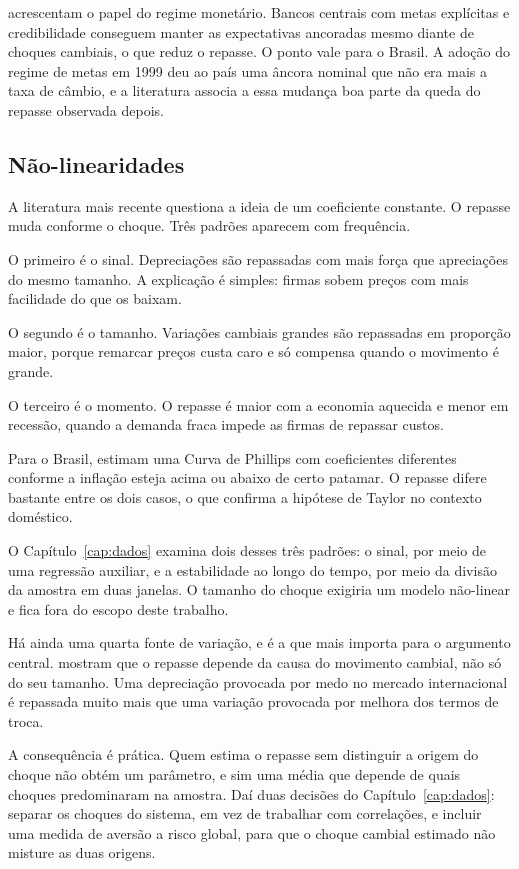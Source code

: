 \documentclass[12pt,openright,oneside,a4paper,portuguese,brazil]{abntex2}
\begin{document}
 acrescentam o papel do regime monetário. Bancos centrais
com metas explícitas e credibilidade conseguem manter as expectativas ancoradas
mesmo diante de choques cambiais, o que reduz o repasse. O ponto vale para o Brasil. A adoção do regime de metas em 1999 deu ao país
uma âncora nominal que não era mais a taxa de câmbio, e a literatura associa a
essa mudança boa parte da queda do repasse observada depois.

\subsection{Não-linearidades}
\label{sec:naolinear-lit}

A literatura mais recente questiona a ideia de um coeficiente constante. O
repasse muda conforme o choque. Três padrões aparecem com frequência.

O primeiro é o sinal. Depreciações são repassadas com mais força que apreciações
do mesmo tamanho. A explicação é simples: firmas sobem preços com mais facilidade
do que os baixam.

O segundo é o tamanho. Variações cambiais grandes são repassadas em proporção
maior, porque remarcar preços custa caro e só compensa quando o movimento é
grande.

O terceiro é o momento. O repasse é maior com a economia aquecida e menor em
recessão, quando a demanda fraca impede as firmas de repassar custos.

Para o Brasil,  estimam uma Curva de Phillips com
coeficientes diferentes conforme a inflação esteja acima ou abaixo de certo
patamar. O repasse difere bastante entre os dois casos, o que confirma a hipótese
de Taylor no contexto doméstico.

O Capítulo~\ref{cap:dados} examina dois desses três padrões: o sinal, por meio de
uma regressão auxiliar, e a estabilidade ao longo do tempo, por meio da divisão
da amostra em duas janelas. O tamanho do choque exigiria um modelo não-linear e
fica fora do escopo deste trabalho.

Há ainda uma quarta fonte de variação, e é a que mais importa para o argumento
central.  mostram que o repasse depende da causa do
movimento cambial, não só do seu tamanho. Uma depreciação provocada por medo no
mercado internacional é repassada muito mais que uma variação provocada por
melhora dos termos de troca.

A consequência é prática. Quem estima o repasse sem distinguir a origem do
choque não obtém um parâmetro, e sim uma média que depende de quais choques
predominaram na amostra. Daí duas decisões do Capítulo~\ref{cap:dados}: separar
os choques do sistema, em vez de trabalhar com correlações, e incluir uma medida
de aversão a risco global, para que o choque cambial estimado não misture as duas
origens.
\end{document}
